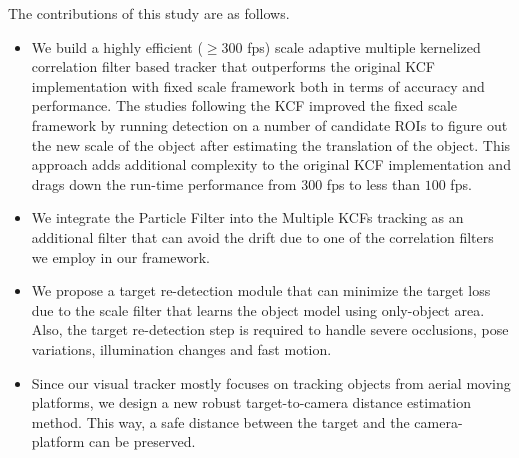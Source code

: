 \documentclass[10pt,twocolumn,letterpaper]{article}
\newcounter{ct}
\begin{document}
The contributions of this study are as follows.
\begin{itemize}
\item We build a highly efficient ($\geq300$ fps) scale adaptive multiple kernelized correlation filter based tracker that outperforms the original KCF implementation with fixed scale framework both in terms of accuracy and performance. The studies following the KCF improved the fixed scale framework by running detection on a number of candidate ROIs to figure out the new scale of the object after estimating the translation of the object. This approach adds additional complexity to the original KCF implementation and drags down the run-time performance from $300$ fps to less than $100$ fps.
\item We integrate the Particle Filter into the Multiple KCFs tracking as an additional filter that can avoid the drift due to one of the correlation filters we employ in our framework.
\item We propose a target re-detection module that can minimize the target loss due to the scale filter that learns the object model using only-object area. Also, the target re-detection step is required to handle severe occlusions, pose variations, illumination changes and fast motion.
\item Since our visual tracker mostly focuses on tracking objects from aerial moving platforms, we design a new robust target-to-camera distance estimation method. This way, a safe distance between the target and the camera-platform can be preserved.
\end{itemize}

\end{document}
